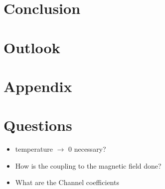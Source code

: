 \section{Conclusion}
\section{Outlook}
\section{Appendix}


\section{Questions}
\begin{itemize}
  \item temperature $\rightarrow$ 0 necessary?
  \item How is the coupling to the magnetic field done?
  \item What are the Channel coefficients \cite{PhysRevB.31.6207}
\end{itemize}

\clearpage




